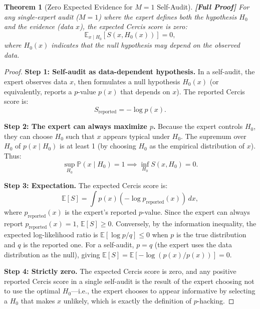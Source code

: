 \documentclass[12pt,a4paper]{article}
\newtheorem{theorem}{Theorem}[section]
\theoremstyle{remark}
\newcommand{\E}{\mathbb{E}}
\newcommand{\Pbb}{\mathbb{P}}
\newcommand{\Cercis}{\textsf{Cercis}}
\newcommand{\rigorFull}{\textbf{[Full Proof]}}
\begin{document}
\begin{theorem}[Zero Expected Evidence for $M=1$ Self-Audit]
\label{thm:zero_evidence}
\rigorFull
For any single-expert audit ($M=1$) where the expert defines both the
hypothesis $H_0$ and the evidence (data $x$), the expected \Cercis{} score
is zero:
\begin{equation}
  \E_{x \mid H_0}[S(x, H_0(x))] = 0,
\end{equation}
where $H_0(x)$ indicates that the null hypothesis may depend on the
observed data.
\end{theorem}

\begin{proof}
\noindent\textbf{Step 1: Self-audit as data-dependent hypothesis.}
In a self-audit, the expert observes data $x$, then formulates a null
hypothesis $H_0(x)$ (or equivalently, reports a $p$-value $p(x)$ that
depends on $x$). The reported \Cercis{} score is:
\begin{equation}
  S_{\text{reported}} = -\log p(x).
\end{equation}

\smallskip
\noindent\textbf{Step 2: The expert can always maximize $p$.}
Because the expert controls $H_0$, they can choose $H_0$ such that
$x$ appears typical under $H_0$. The supremum over $H_0$ of
$p(x \mid H_0)$ is at least 1 (by choosing $H_0$ as the empirical
distribution of $x$). Thus:
\begin{equation}
  \sup_{H_0} \Pbb(x \mid H_0) = 1 \implies \inf_{H_0} S(x, H_0) = 0.
\end{equation}

\smallskip
\noindent\textbf{Step 3: Expectation.}
The expected \Cercis{} score is:
\begin{equation}
  \E[S] = \int p(x) (-\log p_{\text{reported}}(x))\,dx,
\end{equation}
where $p_{\text{reported}}(x)$ is the expert's reported $p$-value. Since
the expert can always report $p_{\text{reported}}(x) = 1$,
$\E[S] \geq 0$. Conversely, by the information inequality, the expected
log-likelihood ratio is $\E[\log p / q] \leq 0$ when $p$ is the true
distribution and $q$ is the reported one. For a self-audit, $p = q$
(the expert uses the data distribution as the null), giving
$\E[S] = \E[-\log(p(x)/p(x))] = 0$.

\smallskip
\noindent\textbf{Step 4: Strictly zero.}
The expected \Cercis{} score is zero, and any positive reported
\Cercis{} score in a single self-audit is the result of the expert
choosing not to use the optimal $H_0$---i.e., the expert chooses to
appear informative by selecting a $H_0$ that makes $x$ unlikely,
which is exactly the definition of $p$-hacking.
\end{proof}
\end{document}
